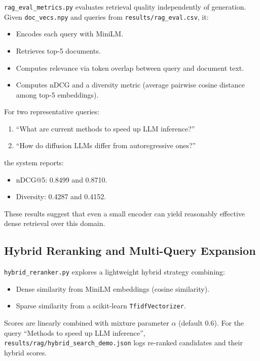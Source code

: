 \documentclass[11pt]{article}
\begin{document}
\verb|rag_eval_metrics.py| evaluates retrieval quality independently of generation. Given \verb|doc_vecs.npy| and queries from \verb|results/rag_eval.csv|, it:

\begin{itemize}[leftmargin=1.5em]
\item Encodes each query with MiniLM.
\item Retrieves top-5 documents.
\item Computes relevance via token overlap between query and document text.
\item Computes nDCG and a diversity metric (average pairwise cosine distance among top-5 embeddings).
\end{itemize}

For two representative queries:

\begin{enumerate}[leftmargin=1.5em]
\item ``What are current methods to speed up LLM inference?''
\item ``How do diffusion LLMs differ from autoregressive ones?''
\end{enumerate}

the system reports:

\begin{itemize}[leftmargin=1.5em]
\item nDCG@5: 0.8499 and 0.8710.
\item Diversity: 0.4287 and 0.4152.
\end{itemize}

These results suggest that even a small encoder can yield reasonably effective dense retrieval over this domain.

\subsection{Hybrid Reranking and Multi-Query Expansion}

\verb|hybrid_reranker.py| explores a lightweight hybrid strategy combining:

\begin{itemize}[leftmargin=1.5em]
\item Dense similarity from MiniLM embeddings (cosine similarity).
\item Sparse similarity from a scikit-learn \verb|TfidfVectorizer|.
\end{itemize}

Scores are linearly combined with mixture parameter $\alpha$ (default 0.6). For the query ``Methods to speed up LLM inference'', \verb|results/rag/hybrid_search_demo.json| logs re-ranked candidates and their hybrid scores.
\end{document}
